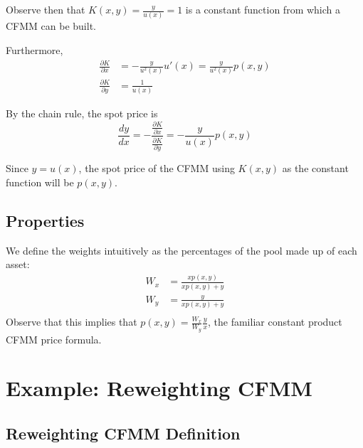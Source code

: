 \documentclass[11pt]{article} %
\begin{document}
Observe then that $K(x,y) = \frac{y}{u(x)} = 1$ is a constant function from which a CFMM can be built.

Furthermore,
\begin{align*}
\frac{\partial K}{\partial x} &= -\frac{y}{u^2(x)}u'(x) = \frac{y}{u^2(x)}p(x,y)\\
\frac{\partial K}{\partial y} &= \frac{1}{u(x)}
\end{align*}

By the chain rule, the spot price is
$$
\frac{dy}{dx} = -\frac{\frac{\partial K}{\partial x}}{\frac{\partial K}{\partial y}} = -\frac{y}{u(x)}p(x,y)
$$

Since $y=u(x)$, the spot price of the CFMM using $K(x,y)$ as the constant function will be $p(x,y)$.







\subsection{Properties}

We define the weights intuitively as the percentages of the pool made up of each asset:
\begin{align*}
W_x &= \frac{xp(x,y)}{xp(x,y) + y}\\
W_y &= \frac{y}{xp(x,y) + y}\\
\end{align*}
Observe that this implies that $p(x,y) = \frac{W_x}{W_y}\frac{y}{x}$, the familiar constant product CFMM price formula.

\section{Example: Reweighting CFMM}

\subsection{Reweighting CFMM Definition}
\end{document}
